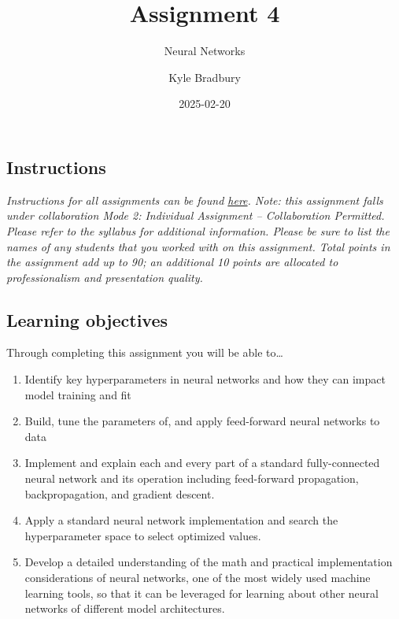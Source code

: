 \documentclass[
  letterpaper,
  DIV=11,
  numbers=noendperiod]{scrartcl}
\title{Assignment 4}
\subtitle{Neural Networks}
\author{Kyle Bradbury}
\date{2025-02-20}
\providecommand{\tightlist}{%
  \setlength{\itemsep}{0pt}\setlength{\parskip}{0pt}}\usepackage{longtable,booktabs,array}
\renewcommand*\contentsname{Table of contents}
\newcommand\contentsname{Table of contents}
\begin{document}
\maketitle

\renewcommand*\contentsname{Table of contents}
{
\hypersetup{linkcolor=}
\setcounter{tocdepth}{1}
\tableofcontents
}

\subsection{Instructions}\label{instructions}

\emph{Instructions for all assignments can be found
\href{https://kylebradbury.github.io/ids705/notebooks/assignment_instructions.html}{here}.
Note: this assignment falls under collaboration Mode 2: Individual
Assignment -- Collaboration Permitted. Please refer to the syllabus for
additional information. Please be sure to list the names of any students
that you worked with on this assignment. Total points in the assignment
add up to 90; an additional 10 points are allocated to professionalism
and presentation quality.}

\subsection{Learning objectives}\label{learning-objectives}

Through completing this assignment you will be able to\ldots{}

\begin{enumerate}
\def\labelenumi{\arabic{enumi}.}
\tightlist
\item
  Identify key hyperparameters in neural networks and how they can
  impact model training and fit
\item
  Build, tune the parameters of, and apply feed-forward neural networks
  to data
\item
  Implement and explain each and every part of a standard
  fully-connected neural network and its operation including
  feed-forward propagation, backpropagation, and gradient descent.
\item
  Apply a standard neural network implementation and search the
  hyperparameter space to select optimized values.
\item
  Develop a detailed understanding of the math and practical
  implementation considerations of neural networks, one of the most
  widely used machine learning tools, so that it can be leveraged for
  learning about other neural networks of different model architectures.
\end{enumerate}
\end{document}
